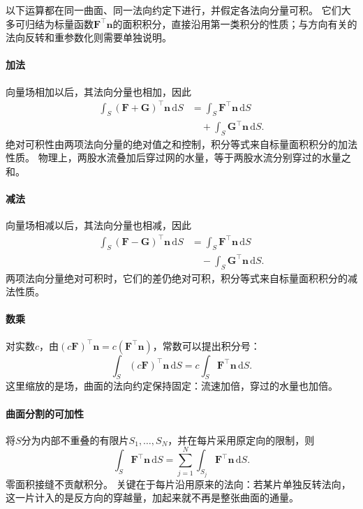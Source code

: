 以下运算都在同一曲面、同一法向约定下进行，并假定各法向分量可积。
它们大多可归结为标量函数$\bm F^\top\bm n$的面积积分，直接沿用第一类积分的性质；与方向有关的法向反转和重参数化则需要单独说明。

\paragraph{加法}

向量场相加以后，其法向分量也相加，因此
\[
 \begin{aligned}
 \int_S(\bm F+\bm G)^\top\bm n\,\mathrm dS
 &=\int_S\bm F^\top\bm n\,\mathrm dS\\
 &\quad{}+\int_S\bm G^\top\bm n\,\mathrm dS.
 \end{aligned}
\]
绝对可积性由两项法向分量的绝对值之和控制，积分等式来自标量面积积分的加法性质。
物理上，两股水流叠加后穿过网的水量，等于两股水流分别穿过的水量之和。

\paragraph{减法}

向量场相减以后，其法向分量也相减，因此
\[
 \begin{aligned}
 \int_S(\bm F-\bm G)^\top\bm n\,\mathrm dS
 &=\int_S\bm F^\top\bm n\,\mathrm dS\\
 &\quad{}-\int_S\bm G^\top\bm n\,\mathrm dS.
 \end{aligned}
\]
两项法向分量绝对可积时，它们的差仍绝对可积，积分等式来自标量面积积分的减法性质。

\paragraph{数乘}

对实数$c$，由$(c\bm F)^\top\bm n=c(\bm F^\top\bm n)$，常数可以提出积分号：
\[
 \int_S(c\bm F)^\top\bm n\,\mathrm dS
 =c\int_S\bm F^\top\bm n\,\mathrm dS.
\]
这里缩放的是场，曲面的法向约定保持固定：流速加倍，穿过的水量也加倍。

\paragraph{曲面分割的可加性}

将$S$分为内部不重叠的有限片$S_1,\ldots,S_N$，并在每片采用原定向的限制，则
\[
 \int_S\bm F^\top\bm n\,\mathrm dS
 =\sum_{j=1}^N\int_{S_j}\bm F^\top\bm n\,\mathrm dS.
\]
零面积接缝不贡献积分。
关键在于每片沿用原来的法向：若某片单独反转法向，这一片计入的是反方向的穿越量，加起来就不再是整张曲面的通量。

